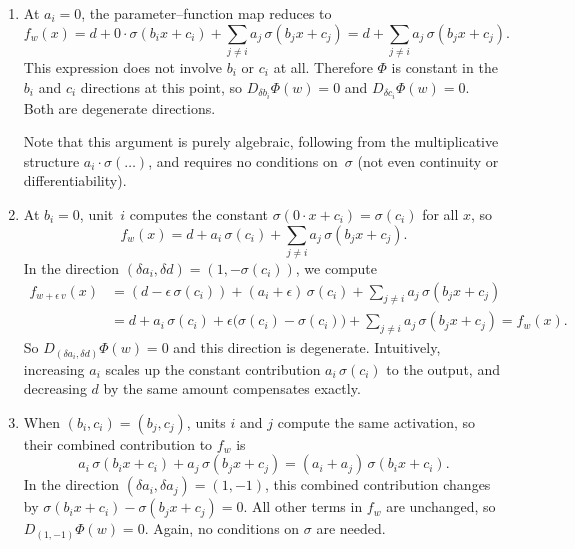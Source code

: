 \documentclass[11pt]{article}
\begin{document}
\begin{solution}
\begin{enumerate}
    \item
        At $a_i = 0$, the parameter--function map reduces to
        \begin{equation*}
            f_w(x)
            = d + 0 \cdot \sigma(b_i x + c_i) + \sum_{j \neq i} a_j\,\sigma(b_j x + c_j)
            = d + \sum_{j \neq i} a_j\,\sigma(b_j x + c_j).
        \end{equation*}
        This expression does not involve $b_i$ or $c_i$ at all. Therefore $\Phi$ is constant in the $b_i$ and $c_i$ directions at this point, so $D_{\delta b_i}\Phi(w) = 0$ and $D_{\delta c_i}\Phi(w) = 0$. Both are degenerate directions.

        Note that this argument is purely algebraic, following from the multiplicative structure $a_i \cdot \sigma(\ldots)$, and requires no conditions on~$\sigma$ (not even continuity or differentiability).

    \item
        At $b_i = 0$, unit~$i$ computes the constant $\sigma(0 \cdot x + c_i) = \sigma(c_i)$ for all $x$, so
        \begin{equation*}
            f_w(x) = d + a_i\,\sigma(c_i) + \sum_{j \neq i} a_j\,\sigma(b_j x + c_j).
        \end{equation*}
        In the direction $(\delta a_i, \delta d) = (1, -\sigma(c_i))$, we compute
        \begin{align*}
            f_{w + \epsilon\,v}(x)
            &= (d - \epsilon\,\sigma(c_i))
                + (a_i + \epsilon)\,\sigma(c_i)
                + \sum_{j \neq i} a_j\,\sigma(b_j x + c_j)
        \\  &= d + a_i\,\sigma(c_i)
                + \epsilon\bigl(\sigma(c_i) - \sigma(c_i)\bigr)
                + \sum_{j \neq i} a_j\,\sigma(b_j x + c_j)
            = f_w(x).
        \end{align*}
        So $D_{(\delta a_i, \delta d)}\Phi(w) = 0$ and this direction is degenerate. Intuitively, increasing $a_i$ scales up the constant contribution $a_i\,\sigma(c_i)$ to the output, and decreasing $d$ by the same amount compensates exactly.

    \item When $(b_i, c_i) = (b_j, c_j)$, units $i$ and $j$ compute the same activation, so their combined contribution to $f_w$ is
        \begin{equation*}
            a_i\,\sigma(b_i x + c_i) + a_j\,\sigma(b_j x + c_j)
            = (a_i + a_j)\,\sigma(b_i x + c_i).
        \end{equation*}
        In the direction $(\delta a_i, \delta a_j) = (1, -1)$, this combined contribution changes by $\sigma(b_i x + c_i) - \sigma(b_j x + c_j) = 0$. All other terms in $f_w$ are unchanged, so $D_{(1,-1)}\Phi(w) = 0$. Again, no conditions on $\sigma$ are needed. \qedhere
\end{enumerate}
\end{solution}
\end{document}
